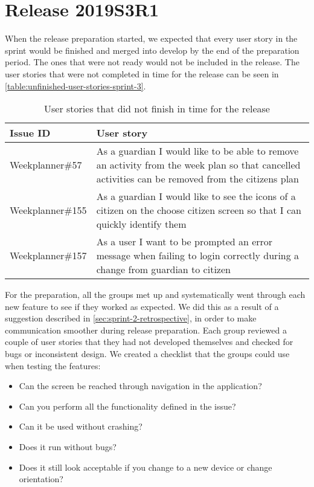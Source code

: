 \section{Release 2019S3R1} \label{sec:sprint-3-release} 
When the release preparation started, we expected that every user story in the sprint would be finished and merged into develop by the end of the preparation period. 
The ones that were not ready would not be included in the release.
The user stories that were not completed in time for the release can be seen in \autoref{table:unfinished-user-stories-sprint-3}.

\begin{table}[H]
    \small
    \begin{tabular}{|p{3.5cm}|p{9cm}|}
    \hline
    Issue ID        & User story   \\ \hline
    Weekplanner\#57  & As a guardian I would like to be able to remove an activity from the week plan so that cancelled activities can be removed from the citizens plan \\ \hline
    Weekplanner\#155 & As a guardian I would like to see the icons of a citizen on the choose citizen screen so that I can quickly identify them \\ \hline
    Weekplanner\#157 & As a user I want to be prompted an error message when failing to login correctly during a change from guardian to citizen \\ \hline
    \end{tabular}
    \caption{User stories that did not finish in time for the release}\label{table:unfinished-user-stories-sprint-3}
\end{table}
\noindent
For the preparation, all the groups met up and systematically went through each new feature to see if they worked as expected. 
We did this as a result of a suggestion described in \autoref{sec:sprint-2-retrospective}, in order to make communication smoother during release preparation.
Each group reviewed a couple of user stories that they had not developed themselves and checked for bugs or inconsistent design. 
We created a checklist that the groups could use when testing the features:
\begin{itemize}
    \item Can the screen be reached through navigation in the application?
    \item Can you perform all the functionality defined in the issue?
    \item Can it be used without crashing?
    \item Does it run without bugs?
    \item Does it still look acceptable if you change to a new device or change orientation?
\end{itemize}
